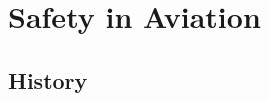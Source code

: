 \documentclass[../dissertation.tex]{subfiles}
\begin{document}



\section{Safety in Aviation}
\subsection{History}
\end{document}
